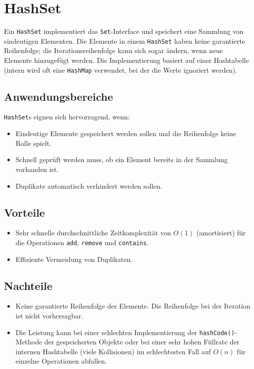 \section{HashSet}
Ein \texttt{HashSet} implementiert das \texttt{Set}-Interface und speichert eine Sammlung von eindeutigen Elementen. Die Elemente in einem \texttt{HashSet} haben keine garantierte Reihenfolge; die Iterationsreihenfolge kann sich sogar ändern, wenn neue Elemente hinzugefügt werden. Die Implementierung basiert auf einer Hashtabelle (intern wird oft eine \texttt{HashMap} verwendet, bei der die Werte ignoriert werden).

\subsection{Anwendungsbereiche}
\texttt{HashSet}s eignen sich hervorragend, wenn:
\begin{itemize}
    \item Eindeutige Elemente gespeichert werden sollen und die Reihenfolge keine Rolle spielt.
    \item Schnell geprüft werden muss, ob ein Element bereits in der Sammlung vorhanden ist.
    \item Duplikate automatisch verhindert werden sollen.
\end{itemize}

\subsection{Vorteile}
\begin{itemize}
    \item Sehr schnelle durchschnittliche Zeitkomplexität von $O(1)$ (amortisiert) für die Operationen \texttt{add}, \texttt{remove} und \texttt{contains}.
    \item Effiziente Vermeidung von Duplikaten.
\end{itemize}

\subsection{Nachteile}
\begin{itemize}
    \item Keine garantierte Reihenfolge der Elemente. Die Reihenfolge bei der Iteration ist nicht vorhersagbar.
    \item Die Leistung kann bei einer schlechten Implementierung der \texttt{hashCode()}-Methode der gespeicherten Objekte oder bei einer sehr hohen Füllrate der internen Hashtabelle (viele Kollisionen) im schlechtesten Fall auf $O(n)$ für einzelne Operationen abfallen.
\end{itemize}

